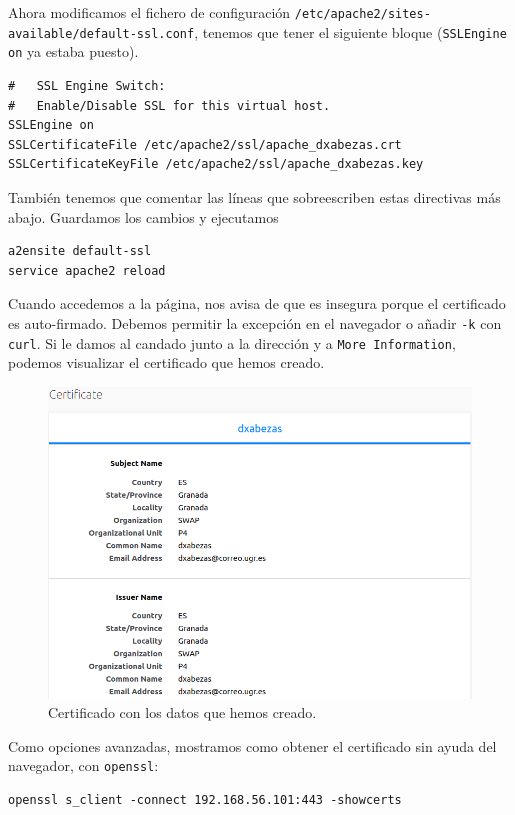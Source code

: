\documentclass{article}
\begin{document}
Ahora modificamos el fichero de configuración \texttt{/etc/apache2/sites-available/default-ssl.conf}, tenemos que tener el siguiente
bloque (\verb|SSLEngine on| ya estaba puesto).

\begin{Verbatim}[tabsize=4]
#   SSL Engine Switch:
#   Enable/Disable SSL for this virtual host.
SSLEngine on
SSLCertificateFile /etc/apache2/ssl/apache_dxabezas.crt
SSLCertificateKeyFile /etc/apache2/ssl/apache_dxabezas.key
\end{Verbatim}
También tenemos que comentar las líneas que sobreescriben estas directivas más abajo. Guardamos los cambios y ejecutamos
\begin{Verbatim}[tabsize=4]
a2ensite default-ssl
service apache2 reload
\end{Verbatim}

Cuando accedemos a la página, nos avisa de que es insegura porque el certificado es auto-firmado. Debemos permitir la excepción en
el navegador o añadir \texttt{-k} con \texttt{curl}. Si le damos al candado junto a la dirección y a \texttt{More Information},
podemos visualizar el certificado que hemos creado.

\begin{figure}[H]
	\centering
	\includegraphics[width=140mm]{imgs/cert-view}
	\caption{Certificado con los datos que hemos creado.}
	\label{fig:cert-view}
\end{figure}

Como opciones avanzadas, mostramos como obtener el certificado sin ayuda del navegador, con \texttt{openssl}:
\begin{Verbatim}[tabsize=4]
openssl s_client -connect 192.168.56.101:443 -showcerts
\end{Verbatim}
\end{document}
